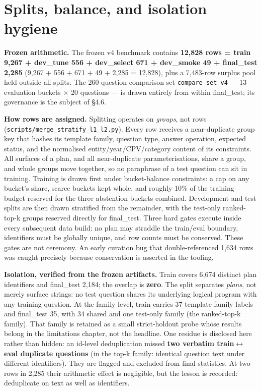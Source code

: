 \documentclass[10pt]{article} %
\begin{document}
\section{Splits, balance, and isolation hygiene}\label{sec:splits-balance-and-isolation-hygiene}

\textbf{Frozen arithmetic.} The frozen v4 benchmark contains \textbf{12,828 rows = train 9,267 + dev\_tune 556 + dev\_select 671 + dev\_smoke 49 + final\_test 2,285} (9,267 + 556 + 671 + 49 + 2,285 = 12,828), plus a 7,483-row surplus pool held outside all splits. The 260-question comparison set \texttt{compare\_set\_v4} --- 13 evaluation buckets $\times$ 20 questions --- is drawn entirely from within final\_test; its governance is the subject of \S4.6.

\textbf{How rows are assigned.} Splitting operates on \emph{groups}, not rows (\texttt{scripts/merge\_stratify\_l1\_l2.py}). Every row receives a near-duplicate group key that hashes its template family, question type, answer operation, expected status, and the normalised entity/year/CPV/category content of its constraints. All surfaces of a plan, and all near-duplicate parameterisations, share a group, and whole groups move together, so no paraphrase of a test question can sit in training. Training is drawn first under bucket-balance constraints: a cap on any bucket's share, scarce buckets kept whole, and roughly 10\% of the training budget reserved for the three abstention buckets combined. Development and test splits are then drawn stratified from the remainder, with the test-only ranked-top-k groups reserved directly for final\_test. Three hard gates execute inside every subsequent data build: no plan may straddle the train/eval boundary, identifiers must be globally unique, and row counts must be conserved. These gates are not ceremony. An early curation bug that double-referenced 1,634 rows was caught precisely because conservation is asserted in the tooling.

\textbf{Isolation, verified from the frozen artifacts.} Train covers 6,674 distinct plan identifiers and final\_test 2,184; the overlap is \textbf{zero}. The split separates \emph{plans}, not merely surface strings: no test question shares its underlying logical program with any training question. At the family level, train carries 37 template-family labels and final\_test 35, with 34 shared and one test-only family (the ranked-top-k family). That family is retained as a small strict-holdout probe whose results belong in the limitations chapter, not the headline. One residue is disclosed here rather than hidden: an id-level deduplication missed \textbf{two verbatim train$\leftrightarrow$eval duplicate questions} (in the top-k family: identical question text under different identifiers). They are flagged and excluded from final statistics. At two rows in 2,285 their arithmetic effect is negligible, but the lesson is recorded: deduplicate on text as well as identifiers.
\end{document}
